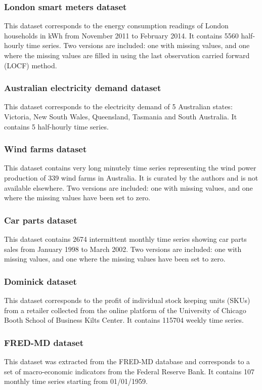 \subsubsection{London smart meters dataset}
This dataset corresponds to the energy consumption readings of London households in kWh from November 2011 to February 2014. It contains 5560 half-hourly time series. Two versions are included: one with missing values, and one where the missing values are filled in using the last observation carried forward (LOCF) method. 

\subsubsection{Australian electricity demand dataset}
This dataset corresponds to the electricity demand of 5 Australian states: Victoria, New South Wales, Queensland, Tasmania and South Australia. It contains 5 half-hourly time series.

\subsubsection{Wind farms dataset}
This dataset contains very long minutely time series representing the wind power production of 339
wind farms in Australia. It is curated by the authors and is not available elsewhere. Two versions are included: one with missing values, and one where the missing values have been set to zero.

\subsubsection{Car parts dataset}
This dataset contains 2674 intermittent monthly time series showing car parts sales from January
1998 to March 2002. Two versions are included: one with missing values, and one where the missing values have been set to zero.

\subsubsection{Dominick dataset}
This dataset corresponds to the profit of individual stock keeping units (SKUs) from a retailer collected from the online platform of the University of Chicago Booth School of Business Kilts Center. It contains 115704 weekly time series.

\subsubsection{FRED-MD dataset}
This dataset was extracted from the FRED-MD database and corresponds to  a set of macro-economic indicators from the Federal Reserve Bank. It contains 107 monthly time series starting from  01/01/1959.

